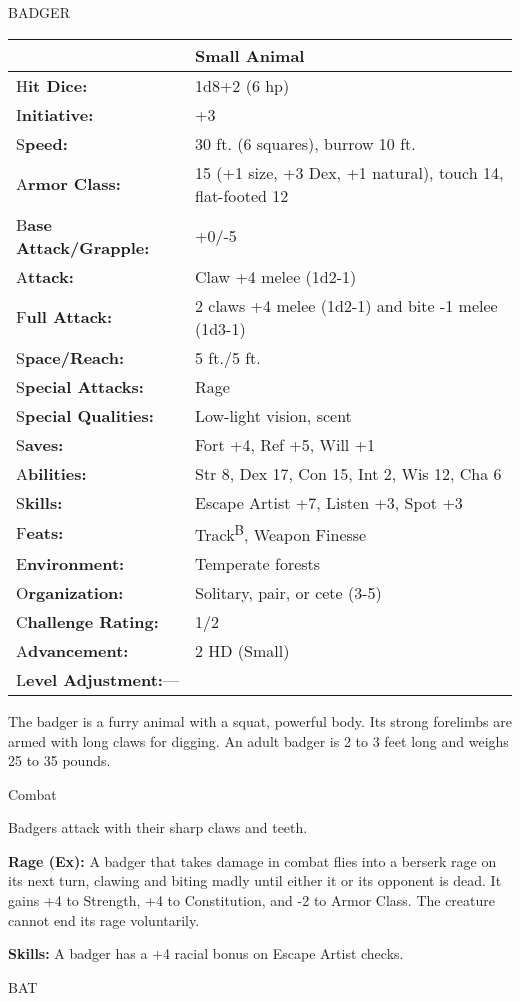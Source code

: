 \documentclass{article}
\begin{document}
\vspace{12pt}
BADGER

\begin{tabular}{|>{\raggedright}p{91pt}|>{\raggedright}p{226pt}|}
\hline
  & Small Animal\tabularnewline
\hline
H\textbf{it Dice:} & 1d8+2 (6 hp)\tabularnewline
\hline
I\textbf{nitiative:} & +3\tabularnewline
\hline
S\textbf{peed:} & 30 ft. (6 squares), burrow 10 ft.\tabularnewline
\hline
A\textbf{rmor Class:} & 15 (+1 size, +3 Dex, +1 natural), touch 14, flat-footed 
12\tabularnewline
\hline
B\textbf{ase Attack/Grapple:} & +0/-5\tabularnewline
\hline
A\textbf{ttack:} & Claw +4 melee (1d2-1)\tabularnewline
\hline
F\textbf{ull Attack:} & 2 claws +4 melee (1d2-1) and bite -1 melee (1d3-1)\tabularnewline
\hline
S\textbf{pace/Reach:} & 5 ft./5 ft.\tabularnewline
\hline
S\textbf{pecial Attacks:} & Rage\tabularnewline
\hline
S\textbf{pecial Qualities:} & Low-light vision, scent\tabularnewline
\hline
S\textbf{aves:} & Fort +4, Ref +5, Will +1\tabularnewline
\hline
A\textbf{bilities:} & Str 8, Dex 17, Con 15, Int 2, Wis 12, Cha 6\tabularnewline
\hline
S\textbf{kills:} & Escape Artist +7, Listen +3, Spot +3\tabularnewline
\hline
F\textbf{eats:} & Track\textsuperscript{B}, Weapon Finesse\tabularnewline
\hline
E\textbf{nvironment:} & Temperate forests\tabularnewline
\hline
O\textbf{rganization:} & Solitary, pair, or cete (3-5)\tabularnewline
\hline
C\textbf{hallenge Rating:} & 1/2\tabularnewline
\hline
A\textbf{dvancement:} & 2 HD (Small)\tabularnewline
\hline
L\textbf{evel Adjustment:}--- & \tabularnewline
\hline
\end{tabular}

The badger is a furry animal with a squat, powerful body. Its strong forelimbs 
are armed with long claws for digging. An adult badger is 2 to 3 feet long and 
weighs 25 to 35 pounds.

Combat

Badgers attack with their sharp claws and teeth.

\textbf{Rage (Ex):} A badger that takes damage in combat flies into a berserk rage 
on its next turn, clawing and biting madly until either it or its opponent is dead. 
It gains +4 to Strength, +4 to Constitution, and -2 to Armor Class. The creature 
cannot end its rage voluntarily.

\textbf{Skills:} A badger has a +4 racial bonus on Escape Artist checks. 

\vspace{12pt}
BAT
\end{document}
